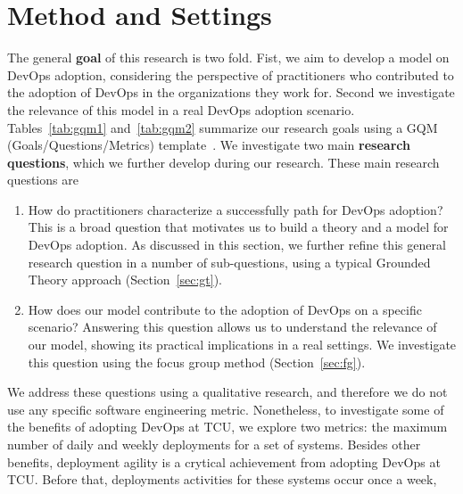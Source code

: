 \section{Method and Settings}\label{sec:method}

  The general {\bf goal} of this research is two fold.
  Fist, we aim to develop 
  a model on DevOps adoption, considering the perspective of practitioners who
  contributed to the adoption of DevOps in the
  organizations they work for. Second we investigate the relevance
  of this model in a real DevOps adoption scenario.
  Tables~\ref{tab:gqm1} and~\ref{tab:gqm2} summarize our
  research goals using a GQM (Goals/Questions/Metrics)
  template~\cite{wohlin:book}.
  We investigate two main {\bf research questions}, which we
  further develop during our research. These main research
  questions are

\begin{enumerate}[(RQ1)]
 \item How do practitioners characterize a successfully path
   for DevOps adoption? This is a broad question that motivates 
   us to build a theory and a model for DevOps adoption. As discussed
   in this section, we further refine this general research question
   in a number of sub-questions, using a typical Grounded Theory approach
   (Section~\ref{sec:gt}).

 \item How does our model contribute to the adoption of DevOps on a
   specific scenario? Answering this question allows us to understand
   the relevance of our model, showing its practical implications
   in a real settings. We investigate this question using the
   focus group method (Section~\ref{sec:fg}). 
\end{enumerate}

We address these questions using a qualitative research, and
therefore we do not use any specific software engineering
metric. Nonetheless, to investigate some of the benefits of
adopting DevOps at TCU, we explore two metrics: the maximum number of daily and weekly deployments
for a set of systems. Besides other benefits, deployment agility 
is a crytical achievement from adopting DevOps at
TCU. Before that, deployments activities for these
systems occur once a week,

